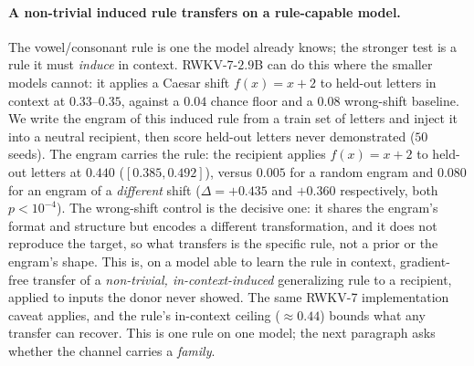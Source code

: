 \documentclass[11pt]{article}
\theoremstyle{definition}
\begin{document}
\paragraph{A non-trivial induced rule transfers on a rule-capable model.}
The vowel/consonant rule is one the model already knows; the stronger test is a rule it must \emph{induce} in context. RWKV-7-$2.9$B can do this where the smaller models cannot: it applies a Caesar shift $f(x)=x{+}2$ to held-out letters in context at $0.33$--$0.35$, against a $0.04$ chance floor and a $0.08$ wrong-shift baseline. We write the engram of this induced rule from a train set of letters and inject it into a neutral recipient, then score held-out letters never demonstrated ($50$ seeds). The engram carries the rule: the recipient applies $f(x)=x{+}2$ to held-out letters at $0.440$ ($[0.385,0.492]$), versus $0.005$ for a random engram and $0.080$ for an engram of a \emph{different} shift ($\Delta=+0.435$ and $+0.360$ respectively, both $p<10^{-4}$). The wrong-shift control is the decisive one: it shares the engram's format and structure but encodes a different transformation, and it does not reproduce the target, so what transfers is the specific rule, not a prior or the engram's shape. This is, on a model able to learn the rule in context, gradient-free transfer of a \emph{non-trivial, in-context-induced} generalizing rule to a recipient, applied to inputs the donor never showed. The same RWKV-7 implementation caveat applies, and the rule's in-context ceiling ($\approx 0.44$) bounds what any transfer can recover. This is one rule on one model; the next paragraph asks whether the channel carries a \emph{family}.
\end{document}

